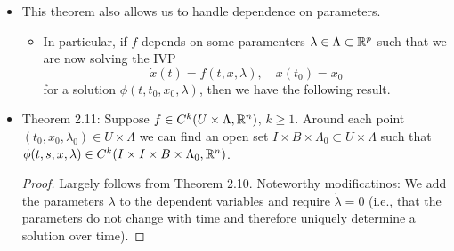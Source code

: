 \documentclass[../notes.tex]{subfiles}
\begin{document}
\begin{itemize}
\begin{proof}
        Additionally, $\pdv*{\phi}{x}$ is continuous as the solution to the first variational equation. This completes the base case.\par\smallskip
        Now suppose via strong induction that the claim holds for $1,\dots,k$, and let $f\in C^{k+1}$. Then $\phi(t,x)\in C^1$ and $\pdv*{\phi}{x}$ solves the first variational equation, as per the base case. But since $A(t,x)\in C^k$ and hence $\pdv*{\phi}{x}\in C^k$, we have by Lemma 2.3 that $\phi(t,x)\in C^{k+1}$.
    \end{proof}
    \item This theorem also allows us to handle dependence on parameters.
    \begin{itemize}
        \item In particular, if $f$ depends on some paramenters $\lambda\in\Lambda\subset\mathbb{R}^p$ such that we are now solving the IVP
        \begin{equation*}
            \dot{x}(t) = f(t,x,\lambda)
            ,\quad
            x(t_0) = x_0
        \end{equation*}
        for a solution $\phi(t,t_0,x_0,\lambda)$, then we have the following result.
    \end{itemize}
    \item Theorem 2.11: Suppose $f\in C^k(U\times\Lambda,\mathbb{R}^n)$, $k\geq 1$. Around each point $(t_0,x_0,\lambda_0)\in U\times\Lambda$ we can find an open set $I\times B\times\Lambda_0\subset U\times\Lambda$ such that $\phi(t,s,x,\lambda)\in C^k(I\times I\times B\times\Lambda_0,\mathbb{R}^n)$.
    \begin{proof}
        Largely follows from Theorem 2.10. Noteworthy modificatinos: We add the parameters $\lambda$ to the dependent variables and require $\dot{\lambda}=0$ (i.e., that the parameters do not change with time and therefore uniquely determine a solution over time).
    \end{proof}
\end{itemize}
\end{document}
